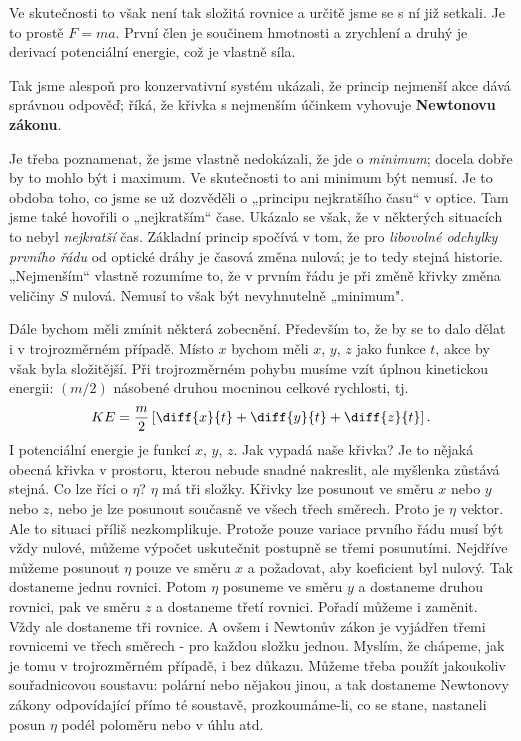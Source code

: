     Ve skutečnosti to však není tak složitá rovnice a určitě jsme se s ní již setkali. Je to prostě
    \(F=ma\). První člen je součinem hmotnosti a zrychlení a druhý je derivací potenciální energie,
    což je vlastně síla.

    Tak jsme alespoň pro konzervativní systém ukázali, že princip nejmenší akce dává správnou
    odpověď; říká, že křivka s nejmenším účinkem vyhovuje \textbf{Newtonovu zákonu}.

    Je třeba poznamenat, že jsme vlastně nedokázali, že jde o \emph{minimum}; docela dobře by to
    mohlo být i maximum. Ve skutečnosti to ani minimum být nemusí. Je to obdoba toho, co jsme se už
    dozvěděli o „principu nejkratšího času“ v optice. Tam jsme také hovořili o „nejkratším“ čase.
    Ukázalo se však, že v některých situacích to nebyl \emph{nejkratší} čas. Základní princip
    spočívá v tom, že pro \emph{libovolné odchylky prvního řádu} od optické dráhy je časová změna
    nulová; je to tedy stejná historie. „Nejmenším“ vlastně rozumíme to, že v prvním řádu je při
    změně křivky změna veličiny \(S\) nulová. Nemusí to však být nevyhnutelně „minimum".
    
    Dále bychom měli zmínit některá zobecnění. Především to, že by se to dalo dělat i v
    trojrozměrném případě. Místo \(x\) bychom měli \(x\), \(y\), \(z\) jako funkce \(t\), akce by
    však byla složitější. Při trojrozměrném pohybu musíme vzít úplnou kinetickou energii: \((m/2)\)
    násobené druhou mocninou celkové rychlosti, tj.
    \begin{equation*}
      KE = \dfrac{m}{2}\left[\diff{x}{t} +\diff{y}{t} + \diff{z}{t}\right].
    \end{equation*}
    I potenciální energie je funkcí \(x\), \(y\), \(z\). Jak vypadá naše křivka? Je to nějaká obecná
    křivka v prostoru, kterou nebude snadné nakreslit, ale myšlenka zůstává stejná. Co lze říci o
    \(\eta\)? \(\eta\) má tři složky. Křivky lze posunout ve směru \(x\) nebo \(y\) nebo \(z\), nebo
    je lze posunout současně ve všech třech směrech. Proto je \(\eta\) vektor. Ale to situaci příliš
    nezkomplikuje. Protože pouze variace prvního řádu musí být vždy nulové, můžeme výpočet
    uskutečnit postupně se třemi posunutími. Nejdříve můžeme posunout \(\eta\) pouze ve směru \(x\)
    a požadovat, aby koeficient byl nulový. Tak dostaneme jednu rovnici. Potom \(\eta\) posuneme ve
    směru \(y\) a dostaneme druhou rovnici, pak ve směru \(z\) a dostaneme třetí rovnici. Pořadí
    můžeme i zaměnit. Vždy ale dostaneme tři rovnice. A ovšem i Newtonův zákon je vyjádřen třemi
    rovnicemi ve třech směrech - pro každou složku jednou. Myslím, že chápeme, jak je tomu v
    trojrozměrném případě, i bez důkazu. Můžeme třeba použít jakoukoliv souřadnicovou soustavu:
    polární nebo nějakou jinou, a tak dostaneme Newtonovy zákony odpovídající přímo té soustavě,
    prozkoumáme-li, co se stane, nastaneli posun \(\eta\) podél poloměru nebo v úhlu atd.

